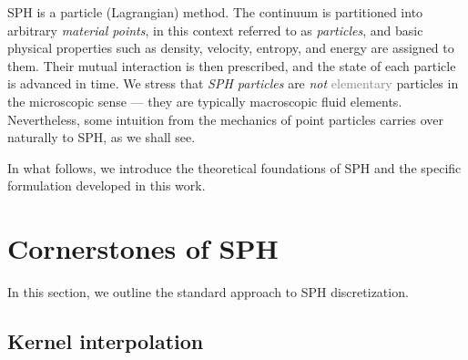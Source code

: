 \documentclass[../main.tex]{subfiles}
\begin{document}
SPH is a particle (Lagrangian) method.   The continuum is partitioned into arbitrary \emph{material points}, in this context referred to as \emph{particles}, and basic physical properties such as density, velocity, entropy, and energy are assigned to them. Their mutual interaction is then prescribed, and the state of each particle is advanced in time. 
We stress that \emph{SPH particles} are \emph{not} \textcolor{gray}{elementary} particles in the microscopic sense --- they are typically macroscopic fluid elements. Nevertheless, some intuition from the mechanics of point particles carries over naturally to SPH, as we shall see.

In what follows, we introduce the theoretical foundations of SPH and the specific formulation developed in this work.

\section{Cornerstones of SPH}
\label{sec:CORNERSTONES}

In this section, we outline the standard approach to SPH discretization.

\subsection{Kernel interpolation}
\label{sec:INTERPOLATION}
\end{document}

